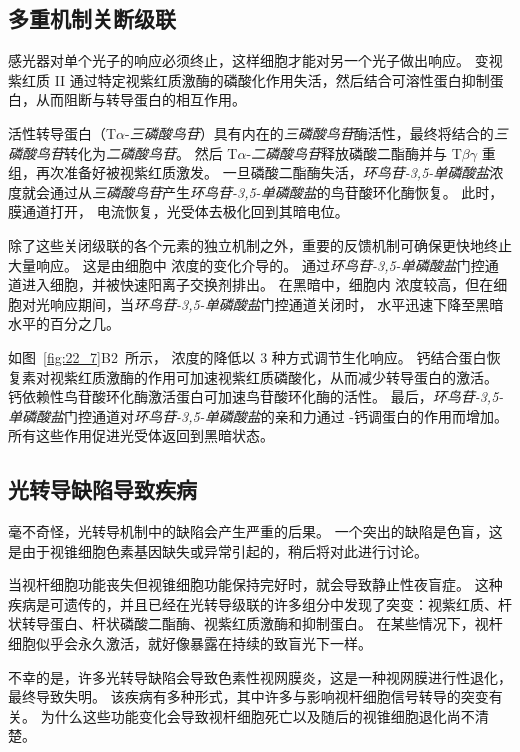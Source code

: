 \subsection{多重机制关断级联}

感光器对单个光子的响应必须终止，这样细胞才能对另一个光子做出响应。
变视紫红质 II 通过特定视紫红质激酶的磷酸化作用失活，然后结合可溶性蛋白抑制蛋白，从而阻断与转导蛋白的相互作用。


活性转导蛋白（T$\alpha$-\textit{三磷酸鸟苷}）具有内在的\textit{三磷酸鸟苷}酶活性，最终将结合的\textit{三磷酸鸟苷}转化为\textit{二磷酸鸟苷}。
然后 T$\alpha$-\textit{二磷酸鸟苷}释放磷酸二酯酶并与 T$\beta$$\gamma$ 重组，再次准备好被视紫红质激发。
一旦磷酸二酯酶失活，\textit{环鸟苷-3,5-单磷酸盐}浓度就会通过从\textit{三磷酸鸟苷}产生\textit{环鸟苷-3,5-单磷酸盐}的鸟苷酸环化酶恢复。
此时，膜通道打开， 电流恢复，光受体去极化回到其暗电位。


除了这些关闭级联的各个元素的独立机制之外，重要的反馈机制可确保更快地终止大量响应。
这是由细胞中  浓度的变化介导的。
通过\textit{环鸟苷-3,5-单磷酸盐}门控通道进入细胞，并被快速阳离子交换剂排出。
在黑暗中，细胞内  浓度较高，但在细胞对光响应期间，当\textit{环鸟苷-3,5-单磷酸盐}门控通道关闭时， 水平迅速下降至黑暗水平的百分之几。


如图~\ref{fig:22_7}B2~所示， 浓度的降低以 3 种方式调节生化响应。
钙结合蛋白恢复素对视紫红质激酶的作用可加速视紫红质磷酸化，从而减少转导蛋白的激活。
钙依赖性鸟苷酸环化酶激活蛋白可加速鸟苷酸环化酶的活性。
最后，\textit{环鸟苷-3,5-单磷酸盐}门控通道对\textit{环鸟苷-3,5-单磷酸盐}的亲和力通过 -钙调蛋白的作用而增加。
所有这些作用促进光受体返回到黑暗状态。



\subsection{光转导缺陷导致疾病}

毫不奇怪，光转导机制中的缺陷会产生严重的后果。
一个突出的缺陷是色盲，这是由于视锥细胞色素基因缺失或异常引起的，稍后将对此进行讨论。


当视杆细胞功能丧失但视锥细胞功能保持完好时，就会导致静止性夜盲症。
这种疾病是可遗传的，并且已经在光转导级联的许多组分中发现了突变：视紫红质、杆状转导蛋白、杆状磷酸二酯酶、视紫红质激酶和抑制蛋白。
在某些情况下，视杆细胞似乎会永久激活，就好像暴露在持续的致盲光下一样。


不幸的是，许多光转导缺陷会导致色素性视网膜炎，这是一种视网膜进行性退化，最终导致失明。
该疾病有多种形式，其中许多与影响视杆细胞信号转导的突变有关。
为什么这些功能变化会导致视杆细胞死亡以及随后的视锥细胞退化尚不清楚。



